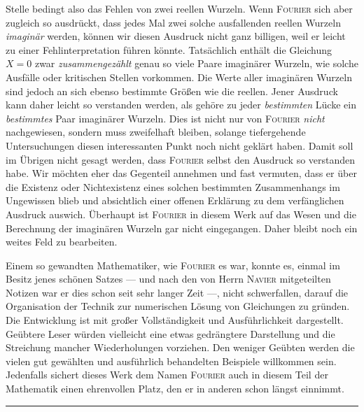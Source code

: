 Stelle bedingt also das Fehlen von zwei reellen Wurzeln. Wenn \textsc{Fourier} sich aber zugleich so ausdrückt, dass jedes Mal zwei solche ausfallenden reellen Wurzeln \textit{imaginär} werden, können wir diesen Ausdruck nicht ganz billigen, weil er leicht zu einer Fehlinterpretation führen könnte. Tatsächlich enthält die Gleichung $X=0$ zwar \textit{zusammengezählt} genau so viele Paare imaginärer Wurzeln, wie solche Ausfälle oder kritischen Stellen vorkommen. Die Werte aller imaginären Wurzeln sind jedoch an sich ebenso bestimmte Größen wie die reellen. Jener Ausdruck kann daher leicht so verstanden werden, als gehöre zu jeder \textit{bestimmten} Lücke ein \textit{bestimmtes} Paar imaginärer Wurzeln. Dies ist nicht nur von \textsc{Fourier} \textit{nicht} nachgewiesen, sondern muss zweifelhaft bleiben, solange tiefergehende Untersuchungen diesen interessanten Punkt noch nicht geklärt haben. Damit soll im Übrigen nicht gesagt werden, dass \textsc{Fourier} selbst den Ausdruck so verstanden habe. Wir möchten eher das Gegenteil annehmen und fast vermuten, dass er über die Existenz oder Nichtexistenz eines solchen bestimmten Zusammenhangs im Ungewissen blieb und absichtlich einer offenen Erklärung zu dem verfänglichen Ausdruck auswich. Überhaupt ist \textsc{Fourier} in diesem Werk auf das Wesen und die Berechnung der imaginären Wurzeln gar nicht eingegangen. Daher bleibt noch ein weites Feld zu bearbeiten.\par
Einem so gewandten Mathematiker, wie \textsc{Fourier} es war, konnte es, einmal im Besitz jenes schönen Satzes --- und nach den von Herrn \textsc{Navier} mitgeteilten Notizen war er dies schon seit sehr langer Zeit ---, nicht schwerfallen, darauf die Organisation der Technik zur numerischen Lösung von Gleichungen zu gründen. Die Entwicklung ist mit großer Vollständigkeit und Ausführlichkeit dargestellt. Geübtere Leser würden vielleicht eine etwas gedrängtere Darstellung und die Streichung mancher Wiederholungen vorziehen. Den weniger Geübten werden die vielen gut gewählten und ausführlich behandelten Beispiele willkommen sein. Jedenfalls sichert dieses Werk dem Namen \textsc{Fourier} auch in diesem Teil der Mathematik einen ehrenvollen Platz, den er in anderen schon längst einnimmt.\par
\par\noindent\hfill\rule{0.30\linewidth}{0.4pt}\hfill\mbox{}\par
